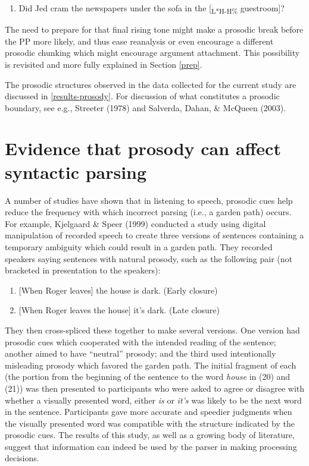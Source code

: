 \documentclass[12pt,oneside]{book}
\providecommand{\tightlist}{%
  \setlength{\itemsep}{0pt}\setlength{\parskip}{0pt}}
\begin{document}
\begin{enumerate}
\def\labelenumi{(\arabic{enumi})}
\setcounter{enumi}{18}
\tightlist
\item
  Did Jed cram the newspapers under the sofa in the {[}\textsubscript{L*H-H\%} guestroom{]}?
\end{enumerate}

The need to prepare for that final rising tone might make a prosodic break before the PP more likely, and thus ease reanalysis or even encourage a different prosodic chunking which might encourage argument attachment. This possibility is revisited and more fully explained in Section \ref{prep}.

The prosodic structures observed in the data collected for the current study are discussed in \ref{results-prosody}. For discussion of what constitutes a prosodic boundary, see e.g., Streeter (1978) and Salverda, Dahan, \& McQueen (2003).

\hypertarget{prosyn}{%
\section{Evidence that prosody can affect syntactic parsing}\label{prosyn}}

A number of studies have shown that in listening to speech, prosodic cues help reduce the frequency with which incorrect parsing (i.e., a garden path) occurs. For example, Kjelgaard \& Speer (1999) conducted a study using digital manipulation of recorded speech to create three versions of sentences containing a temporary ambiguity which could result in a garden path. They recorded speakers saying sentences with natural prosody, such as the following pair (not bracketed in presentation to the speakers):

\begin{enumerate}
\def\labelenumi{(\arabic{enumi})}
\setcounter{enumi}{19}
\tightlist
\item
  {[}When Roger leaves{]} the house is dark. (Early closure)
\item
  {[}When Roger leaves the house{]} it's dark. (Late closure)
\end{enumerate}

They then cross-spliced these together to make several versions. One version had prosodic cues which cooperated with the intended reading of the sentence; another aimed to have ``neutral'' prosody; and the third used intentionally misleading prosody which favored the garden path. The initial fragment of each (the portion from the beginning of the sentence to the word \emph{house} in (20) and (21)) was then presented to participants who were asked to agree or disagree with whether a visually presented word, either \emph{is} or \emph{it's} was likely to be the next word in the sentence. Participants gave more accurate and speedier judgments when the visually presented word was compatible with the structure indicated by the prosodic cues. The results of this study, as well as a growing body of literature, suggest that information can indeed be used by the parser in making processing decisions.
\end{document}
